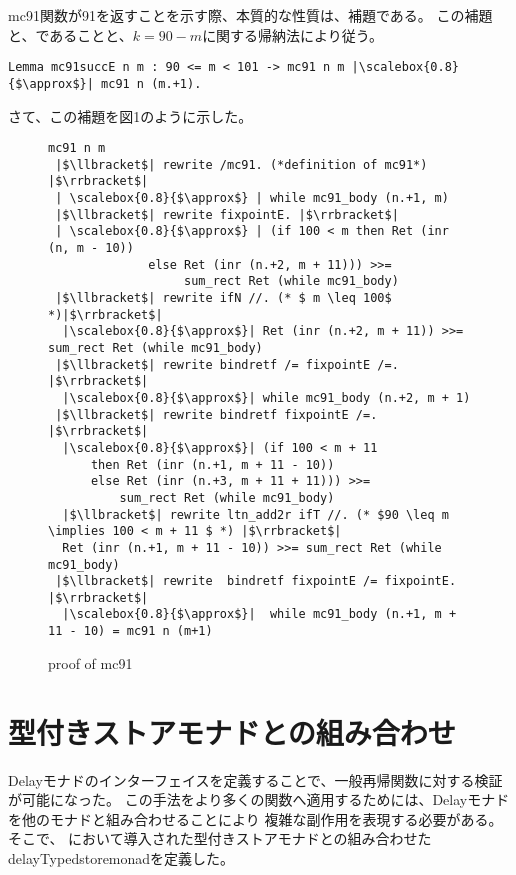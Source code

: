 \documentclass[japanese]{jssst_ppl}
\theoremstyle{definition}
\def\coqin#1{\text{\texttt{#1}}}
\begin{document}
mc91関数が91を返すことを示す際、本質的な性質は、補題\coqin{mc91succE}である。
この補題と、\coqin{mc91 n 101 |$\approx$| Ret 91}であることと、$ k =  90 - m $に関する帰納法により従う。

\begin{verbatim}
Lemma mc91succE n m : 90 <= m < 101 -> mc91 n m |\scalebox{0.8}{$\approx$}| mc91 n (m.+1).
\end{verbatim}

さて、この補題を図1のように示した。

\begin{figure}[H]
  \centering
  \begin{verbatim}
mc91 n m
 |$\llbracket$| rewrite /mc91. (*definition of mc91*) |$\rrbracket$|
 | \scalebox{0.8}{$\approx$} | while mc91_body (n.+1, m)
 |$\llbracket$| rewrite fixpointE. |$\rrbracket$|
 | \scalebox{0.8}{$\approx$} | (if 100 < m then Ret (inr (n, m - 10))
              else Ret (inr (n.+2, m + 11))) >>=
                   sum_rect Ret (while mc91_body)
 |$\llbracket$| rewrite ifN //. (* $ m \leq 100$ *)|$\rrbracket$|
  |\scalebox{0.8}{$\approx$}| Ret (inr (n.+2, m + 11)) >>= sum_rect Ret (while mc91_body)
 |$\llbracket$| rewrite bindretf /= fixpointE /=. |$\rrbracket$|
  |\scalebox{0.8}{$\approx$}| while mc91_body (n.+2, m + 1)
 |$\llbracket$| rewrite bindretf fixpointE /=. |$\rrbracket$|
  |\scalebox{0.8}{$\approx$}| (if 100 < m + 11
      then Ret (inr (n.+1, m + 11 - 10))
      else Ret (inr (n.+3, m + 11 + 11))) >>=
          sum_rect Ret (while mc91_body)
  |$\llbracket$| rewrite ltn_add2r ifT //. (* $90 \leq m \implies 100 < m + 11 $ *) |$\rrbracket$|
  Ret (inr (n.+1, m + 11 - 10)) >>= sum_rect Ret (while mc91_body)
 |$\llbracket$| rewrite  bindretf fixpointE /= fixpointE. |$\rrbracket$|
  |\scalebox{0.8}{$\approx$}|  while mc91_body (n.+1, m + 11 - 10) = mc91 n (m+1)
    \end{verbatim}
  \caption{proof of mc91 }
\end{figure}







\section{型付きストアモナドとの組み合わせ}

Delayモナドのインターフェイスを定義することで、一般再帰関数に対する検証が可能になった。
この手法をより多くの関数へ適用するためには、Delayモナドを他のモナドと組み合わせることにより
複雑な副作用を表現する必要がある。そこで、\cite{practicalformalizationmonadicequational}
において導入された型付きストアモナドとの組み合わせたdelayTypedstoremonadを定義した。
\end{document}
